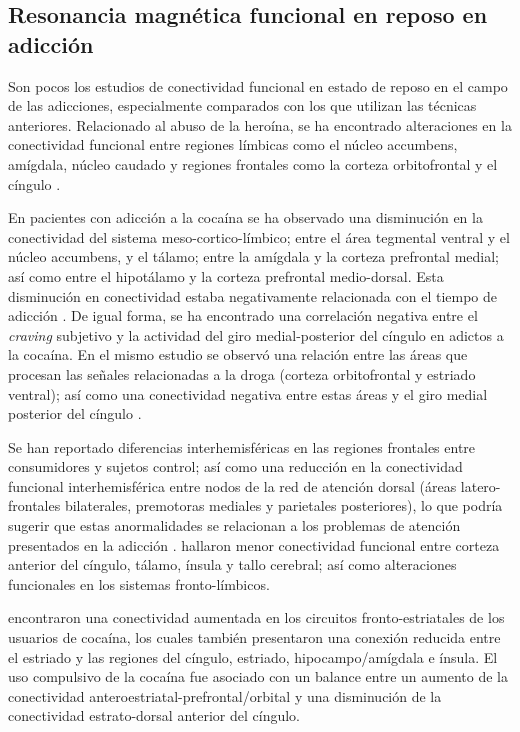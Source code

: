 \subsection{Resonancia magnética funcional en reposo en adicción}
Son pocos los estudios de conectividad funcional en estado de reposo en el campo de las adicciones, especialmente comparados con los que utilizan las técnicas anteriores.
Relacionado al abuso de la heroína, se ha encontrado alteraciones en la conectividad funcional entre regiones límbicas \textemdash{}como el núcleo accumbens, amígdala, núcleo caudado\textemdash{} y regiones frontales \textemdash{}como la corteza orbitofrontal y el cíngulo \parencite{Ma2010,Tianye2015,Wang2010,Zhang2016}.\par
En pacientes con adicción a la cocaína se ha observado una disminución en la conectividad del sistema meso-cortico-límbico; entre el área tegmental ventral y el núcleo accumbens, y el tálamo; entre la amígdala y la corteza prefrontal medial; así como entre el hipotálamo y la corteza prefrontal medio-dorsal.
Esta disminución en conectividad estaba negativamente relacionada con el tiempo de adicción \parencite{Gu2010}.
De igual forma, se ha encontrado una correlación negativa entre el \textit{craving} subjetivo y la actividad del giro medial-posterior del cíngulo en adictos a la cocaína.
En el mismo estudio se observó una relación entre las áreas que procesan las señales relacionadas a la droga (corteza orbitofrontal y estriado ventral);
así como una conectividad negativa entre estas áreas y el giro medial posterior del cíngulo \parencite{Wilcox2011}.\par
Se han reportado diferencias interhemisféricas en las regiones frontales entre consumidores y sujetos control;
así como una reducción en la conectividad funcional interhemisférica entre nodos de la red de atención dorsal (áreas latero-frontales bilaterales, premotoras mediales y parietales posteriores), lo que podría sugerir que estas anormalidades se relacionan a los problemas de atención presentados en la adicción \parencite{Kelly2011a}.
\textcite{Verdejo-Garcia2014} hallaron menor conectividad funcional entre corteza anterior del cíngulo, tálamo, ínsula y tallo cerebral; así como alteraciones funcionales en los sistemas fronto-límbicos.\par
\textcite{Hu2015} encontraron una conectividad aumentada en los circuitos fronto-estriatales de los usuarios de cocaína, los cuales también presentaron una conexión reducida entre el estriado y las regiones del cíngulo, estriado, hipocampo/amígdala e ínsula. El uso compulsivo de la cocaína fue asociado con un balance entre un aumento de la conectividad anteroestriatal-prefrontal/orbital y una disminución de la conectividad estrato-dorsal anterior del cíngulo.\par
